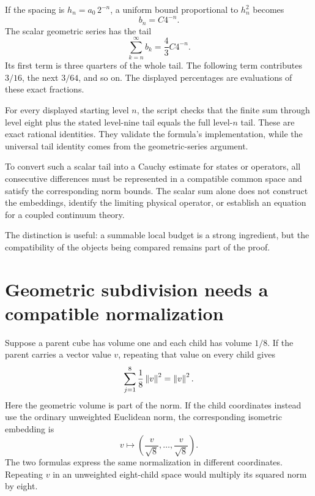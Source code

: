 If the spacing is $h_n=a_0\,2^{-n}$, a uniform bound proportional to $h_n^2$ becomes
\[
b_n=C4^{-n}.
\]
The scalar geometric series has the tail
\[
\sum_{k=n}^{\infty}b_k=\frac43C4^{-n}.
\]
Its first term is three quarters of the whole tail. The following term contributes $3/16$, the next $3/64$, and so on. The displayed percentages are evaluations of these exact fractions.

For every displayed starting level $n$, the script checks that the finite sum through level eight plus the stated level-nine tail equals the full level-$n$ tail. These are exact rational identities. They validate the formula's implementation, while the universal tail identity comes from the geometric-series argument.

To convert such a scalar tail into a Cauchy estimate for states or operators, all consecutive differences must be represented in a compatible common space and satisfy the corresponding norm bounds. The scalar sum alone does not construct the embeddings, identify the limiting physical operator, or establish an equation for a coupled continuum theory.

The distinction is useful: a summable local budget is a strong ingredient, but the compatibility of the objects being compared remains part of the proof.



\clearpage
\section{Geometric subdivision needs a compatible normalization}

Suppose a parent cube has volume one and each child has volume $1/8$. If the parent carries a vector value $v$, repeating that value on every child gives
\[
\sum_{j=1}^8\frac18\left\lVert v\right\rVert^2=\left\lVert v\right\rVert^2.
\]
Here the geometric volume is part of the norm. If the child coordinates instead use the ordinary unweighted Euclidean norm, the corresponding isometric embedding is
\[
v\longmapsto\left(\frac v{\sqrt8},\ldots,\frac v{\sqrt8}\right).
\]
The two formulas express the same normalization in different coordinates. Repeating $v$ in an unweighted eight-child space would multiply its squared norm by eight.

